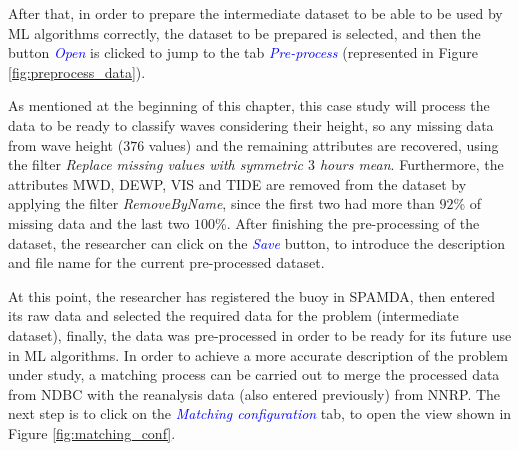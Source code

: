 \begin{onehalfspace}
			
			After that, in order to prepare the intermediate dataset to be able to be used by ML algorithms correctly, the dataset to be prepared is selected, and then the button \textcolor{blue}{\textit{Open}} is clicked to jump to the tab \textcolor{blue}{\textit{Pre-process}} (represented in Figure \ref{fig:preprocess_data}).

			
			As mentioned at the beginning of this chapter, this case study will process the data to be ready to classify waves considering their height, so any missing data from wave height ($376$ values) and the remaining attributes are recovered, using the filter \textit{Replace missing values with symmetric $3$ hours mean}. Furthermore, the attributes MWD, DEWP, VIS and TIDE are removed from the dataset by applying the filter \textit{RemoveByName}, since the first two had more than $92$\% of missing data and the last two $100$\%. After finishing the pre-processing of the dataset, the researcher can click on the \textcolor{blue}{\textit{Save}} button, to introduce the description and file name for the current pre-processed dataset.
			
			At this point, the researcher has registered the buoy in SPAMDA, then entered its raw data and selected the required data for the problem (intermediate dataset), finally, the data was pre-processed in order to be ready for its future use in ML algorithms. In order to achieve a more accurate description of the problem under study, a matching process can be carried out to merge the processed data from NDBC with the reanalysis data (also entered previously) from NNRP. The next step is to click on the \textcolor{blue}{\textit{Matching configuration}} tab, to open the view shown in  Figure \ref{fig:matching_conf}. 
			

\end{onehalfspace}
